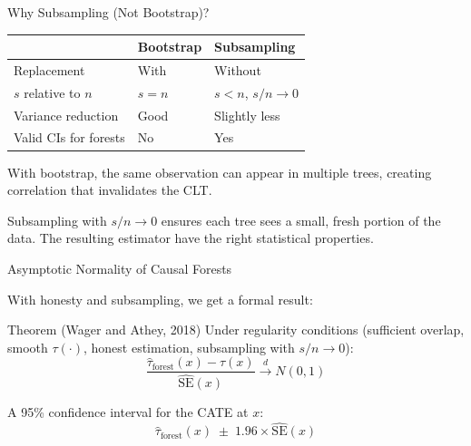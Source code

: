 \documentclass[aspectratio=169, 11pt, handout]{beamer}
\newcommand{\SE}{\mathrm{SE}}
\begin{document}
\begin{frame}{Why Subsampling (Not Bootstrap)?}
 
\begin{center}
\begin{tabular}{p{3.5cm}p{2.8cm}p{3.8cm}}
\toprule
& \textbf{Bootstrap} & \textbf{Subsampling} \\
\midrule
Replacement & With & Without \\
$s$ relative to $n$ & $s = n$ & $s < n$, $s/n \to 0$ \\
Variance reduction & \textcolor{sbgreen}{Good} & Slightly less \\
Valid CIs for forests & \textcolor{warnred}{No} & \textcolor{sbgreen}{Yes} \\
\bottomrule
\end{tabular}
\end{center}
 
\pause
\bigskip
 
With bootstrap, the same observation can appear in multiple trees, creating correlation that invalidates the CLT.
 
\pause
\medskip
 
Subsampling with $s/n \to 0$ ensures each tree sees a small, fresh portion of the data. The resulting estimator have the right statistical properties.
 
\end{frame}
 
\begin{frame}{Asymptotic Normality of Causal Forests}
 
With honesty and subsampling, we get a formal result:
 
\medskip
 
\begin{block}{Theorem (Wager and Athey, 2018)}
Under regularity conditions (sufficient overlap, smooth $\tau(\cdot)$, honest estimation, subsampling with $s/n \to 0$):
\[
\frac{\hat{\tau}_{\text{forest}}(x) - \tau(x)}{\widehat{\SE}(x)} \xrightarrow{d} N(0, 1)
\]
\end{block}
 
\pause
\bigskip
 
A 95\% confidence interval for the CATE at $x$:
\[
\hat{\tau}_{\text{forest}}(x) \;\pm\; 1.96 \times \widehat{\SE}(x)
\]
 
\end{frame}
 
\end{document}
